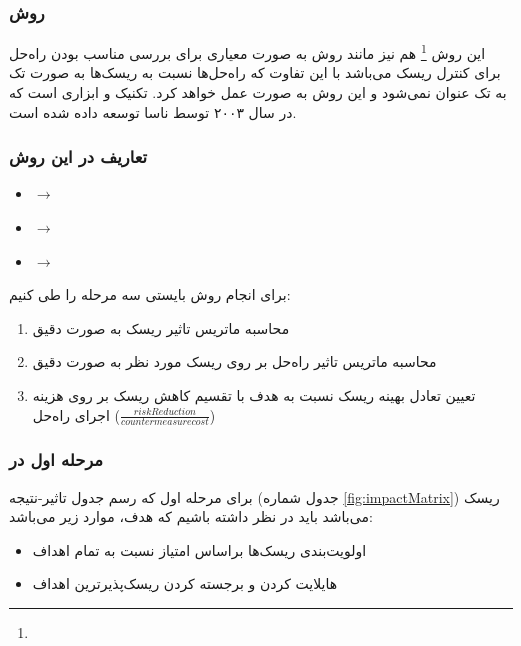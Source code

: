 \subsubsection{روش }

این روش \footnote{} هم نیز مانند روش  به
صورت معیاری برای بررسی مناسب بودن راه‌حل برای کنترل ریسک می‌باشد با این تفاوت که
راه‌حل‌ها نسبت به ریسک‌ها به صورت تک به تک عنوان نمی‌شود و این روش به صورت
 عمل خواهد کرد. تکنیک و ابزاری است که در سال ۲۰۰۳ توسط ناسا
توسعه داده شده است.

\subsubsection*{تعاریف در این روش}

\begin{LTR}
    \begin{itemize}
        \item {} $\rightarrow$ 
        \item {} $\rightarrow$ 
        \item {} $\rightarrow$ 
    \end{itemize}
\end{LTR}

برای انجام روش  بایستی سه مرحله را طی کنیم:

\begin{enumerate}
    \item محاسبه ماتریس تاثیر ریسک به صورت دقیق
    \item محاسبه ماتریس تاثیر راه‌حل بر روی ریسک مورد نظر به صورت دقیق
    \item تعیین تعادل بهینه ریسک نسبت به هدف با تقسیم کاهش ریسک بر روی هزینه
    اجرای راه‌حل ($\frac{risk Reduction}{countermeasure cost}$)
\end{enumerate}

\subsubsection{مرحله اول در }

برای مرحله اول که رسم جدول تاثیر-نتیجه (جدول شماره \ref{fig:impactMatrix}) ریسک
می‌باشد باید در نظر داشته باشیم که هدف، موارد زیر می‌باشد:

\begin{itemize}
    \item اولویت‌بندی ریسک‌ها براساس امتیاز  نسبت به تمام
    اهداف
    \item هایلایت کردن و برجسته کردن ریسک‌پذیر‌ترین اهداف
\end{itemize}

